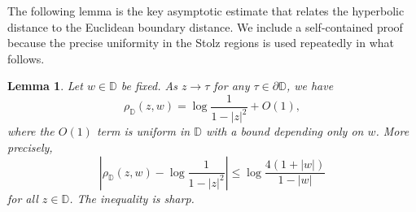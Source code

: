 \documentclass[10pt,a4paper]{amsart}
\numberwithin{equation}{section}
\newtheorem{lemma}[equation]{Lemma}
\begin{document}
The following lemma is the key asymptotic estimate that
relates the hyperbolic distance to the Euclidean boundary distance.
We include a self-contained proof because the precise
uniformity in the Stolz regions is used repeatedly in what
follows.



\begin{lemma} \label{lem:boundary_asymp}
Let $w\in\mathbb{D}$ be fixed. As $z\to\tau$ for any $\tau\in\partial\mathbb{D}$, we have
\begin{equation} \label{eq:boundary_asymp}
\rho_{\mathbb{D}}(z,w) =\log\frac{1}{1-|z|^2}+O(1),
\end{equation}
where the $O(1)$ term is uniform in $\mathbb{D}$ with a bound depending only on $w$. More precisely,
\begin{equation} \label{eq:boundary_asymp_precise}
\left|\rho_{\mathbb{D}}(z,w) -\log\frac{1}{1-|z|^2}\right| \le\log\frac{4(1+|w|)}{1-|w|}
\end{equation}
for all $z\in\mathbb{D}$. The inequality is sharp.
\end{lemma}
\end{document}
